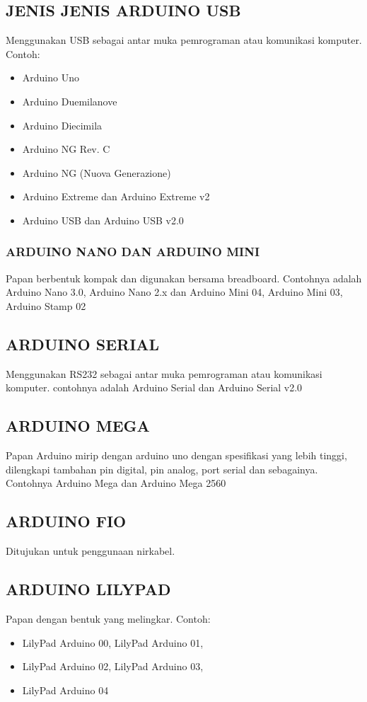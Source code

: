 \subsection {JENIS JENIS ARDUINO USB}
Menggunakan USB sebagai antar muka pemrograman atau komunikasi komputer. Contoh:
\begin{itemize} 
\item Arduino Uno
\item Arduino Duemilanove
\item Arduino Diecimila
\item Arduino NG Rev. C
\item Arduino NG (Nuova Generazione)
\item Arduino Extreme dan Arduino Extreme v2
\item Arduino USB dan Arduino USB v2.0 
\end{itemize}

\subsubsection {ARDUINO NANO DAN ARDUINO MINI}
Papan berbentuk kompak dan digunakan bersama breadboard. Contohnya adalah Arduino Nano 3.0, Arduino Nano 2.x dan Arduino Mini 04, Arduino Mini 03, Arduino Stamp 02


\subsection {ARDUINO SERIAL}
Menggunakan RS232 sebagai antar muka pemrograman atau komunikasi komputer. contohnya adalah Arduino Serial dan Arduino Serial v2.0  

\subsection {ARDUINO MEGA}
Papan Arduino mirip dengan arduino uno dengan spesifikasi yang lebih tinggi, dilengkapi tambahan pin digital, pin analog, port serial dan sebagainya.  Contohnya Arduino Mega dan Arduino Mega 2560  

\subsection {ARDUINO FIO}
Ditujukan untuk penggunaan nirkabel. 

\subsection {ARDUINO LILYPAD}
Papan dengan bentuk yang melingkar. Contoh: 
\begin{itemize}
\item  LilyPad Arduino 00, LilyPad Arduino 01, 
\item LilyPad Arduino 02, LilyPad Arduino 03,
\item LilyPad Arduino 04
\end{itemize}
